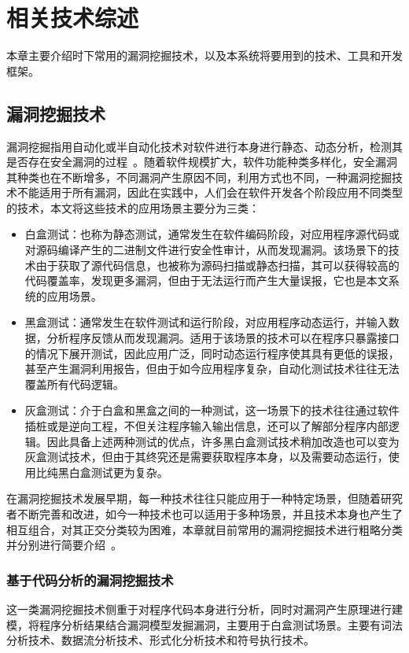 \chapter{相关技术综述}
本章主要介绍时下常用的漏洞挖掘技术，以及本系统将要用到的技术、工具和开发框架。

\section{漏洞挖掘技术}
漏洞挖掘指用自动化或半自动化技术对软件进行本身进行静态、动态分析，检测其是否存在安全漏洞的过程~\cite{liujian2018}。随着软件规模扩大，软件功能种类多样化，安全漏洞其种类也在不断增多，不同漏洞产生原因不同，利用方式也不同，一种漏洞挖掘技术不能适用于所有漏洞，因此在实践中，人们会在软件开发各个阶段应用不同类型的技术，本文将这些技术的应用场景主要分为三类：
\begin{itemize}
    \item  白盒测试：也称为静态测试，通常发生在软件编码阶段，对应用程序源代码或对源码编译产生的二进制文件进行安全性审计，从而发现漏洞。该场景下的技术由于获取了源代码信息，也被称为源码扫描或静态扫描，其可以获得较高的代码覆盖率，发现更多漏洞，但由于无法运行而产生大量误报，它也是本文系统的应用场景。
    \item 黑盒测试：通常发生在软件测试和运行阶段，对应用程序动态运行，并输入数据，分析程序反馈从而发现漏洞。适用于该场景的技术可以在程序只暴露接口的情况下展开测试，因此应用广泛，同时动态运行程序使其具有更低的误报，甚至产生漏洞利用报告，但由于如今应用程序复杂，自动化测试技术往往无法覆盖所有代码逻辑。
    \item 灰盒测试：介于白盒和黑盒之间的一种测试，这一场景下的技术往往通过软件插桩或是逆向工程，不但关注程序输入输出信息，还可以了解部分程序内部逻辑。因此具备上述两种测试的优点，许多黑白盒测试技术稍加改造也可以变为灰盒测试技术，但由于其终究还是需要获取程序本身，以及需要动态运行，使用比纯黑白盒测试更为复杂。
\end{itemize}

在漏洞挖掘技术发展早期，每一种技术往往只能应用于一种特定场景，但随着研究者不断完善和改进，如今一种技术也可以适用于多种场景，并且技术本身也产生了相互组合，对其正交分类较为困难，本章就目前常用的漏洞挖掘技术进行粗略分类并分别进行简要介绍~\cite{liujian2018,meihong2009}。


\subsection{基于代码分析的漏洞挖掘技术}
这一类漏洞挖掘技术侧重于对程序代码本身进行分析，同时对漏洞产生原理进行建模，将程序分析结果结合漏洞模型发掘漏洞，主要用于白盒测试场景。主要有词法分析技术、数据流分析技术、形式化分析技术和符号执行技术。


